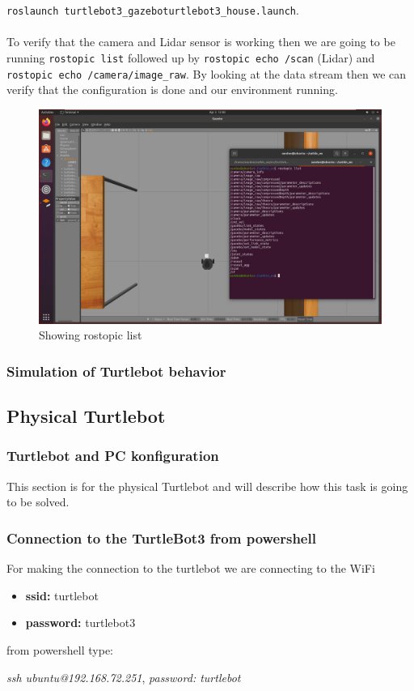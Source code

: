 \documentclass[12pt,a4paper]{article}
\begin{document}
	\noindent\texttt{roslaunch turtlebot3\_gazebo}\texttt{turtlebot3\_house.launch}.
	\\\\
	To verify that the camera and Lidar sensor is working then we are going to be running \texttt{rostopic list} followed up by \texttt{rostopic echo /scan} (Lidar) and \texttt{rostopic echo /camera/image\_raw}. By looking at the data stream then we can verify that the configuration is done and our environment running.
	\begin{figure}[!h]
		\centering
		\includegraphics[width=\linewidth]{fig4.png}
		\caption{Showing rostopic list}
		\label{fig:fig4}
	\end{figure}
	\subsubsection{Simulation of Turtlebot behavior}
	
	\subsection{Physical Turtlebot}
	\subsubsection{Turtlebot and PC konfiguration}
	This section is for the physical Turtlebot and will describe how this task is going to be solved.
	\subsubsection{Connection to the TurtleBot3 from powershell}
	For making the connection to the turtlebot we are connecting to the WiFi 
	\begin{itemize}
		\item \textbf{ssid:} turtlebot
		\item \textbf{password:} turtlebot3
	\end{itemize}
	from powershell type:
	\begin{center}
		\textit{ssh ubuntu@192.168.72.251}, \textit{password: turtlebot}
	\end{center}
\end{document}
